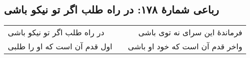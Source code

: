 \begin{center}
\section*{رباعی شمارهٔ ۱۷۸: در راه طلب اگر تو نیکو باشی}
\label{sec:178}
\begin{longtable}{l p{0.5cm} r}
در راه طلب اگر تو نیکو باشی
&&
فرماندهٔ این سرای نه توی باشی
\\
اول قدم آن است که او را طلبی
&&
واخر قدم آن است که خود او باشی
\\
\end{longtable}
\end{center}
